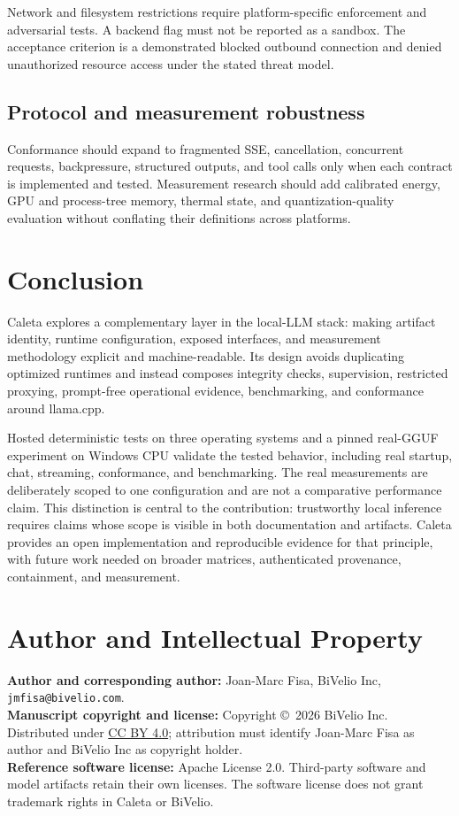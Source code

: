 \documentclass[11pt,a4paper]{article}
\begin{document}
Network and filesystem restrictions require platform-specific enforcement and adversarial tests. A backend flag must not be reported as a sandbox. The acceptance criterion is a demonstrated blocked outbound connection and denied unauthorized resource access under the stated threat model.

\subsection{Protocol and measurement robustness}

Conformance should expand to fragmented SSE, cancellation, concurrent requests, backpressure, structured outputs, and tool calls only when each contract is implemented and tested. Measurement research should add calibrated energy, GPU and process-tree memory, thermal state, and quantization-quality evaluation without conflating their definitions across platforms.

\section{Conclusion}

Caleta explores a complementary layer in the local-LLM stack: making artifact identity, runtime configuration, exposed interfaces, and measurement methodology explicit and machine-readable. Its design avoids duplicating optimized runtimes and instead composes integrity checks, supervision, restricted proxying, prompt-free operational evidence, benchmarking, and conformance around llama.cpp.

Hosted deterministic tests on three operating systems and a pinned real-GGUF experiment on Windows CPU validate the tested behavior, including real startup, chat, streaming, conformance, and benchmarking. The real measurements are deliberately scoped to one configuration and are not a comparative performance claim. This distinction is central to the contribution: trustworthy local inference requires claims whose scope is visible in both documentation and artifacts. Caleta provides an open implementation and reproducible evidence for that principle, with future work needed on broader matrices, authenticated provenance, containment, and measurement.

\section*{Author and Intellectual Property}

\textbf{Author and corresponding author:} Joan-Marc Fisa, BiVelio Inc, \texttt{jmfisa@bivelio.com}.\\
\textbf{Manuscript copyright and license:} Copyright \copyright\ 2026 BiVelio Inc. Distributed under \href{https://creativecommons.org/licenses/by/4.0/}{CC BY 4.0}; attribution must identify Joan-Marc Fisa as author and BiVelio Inc as copyright holder.\\
\textbf{Reference software license:} Apache License 2.0. Third-party software and model artifacts retain their own licenses. The software license does not grant trademark rights in Caleta or BiVelio.
\end{document}
